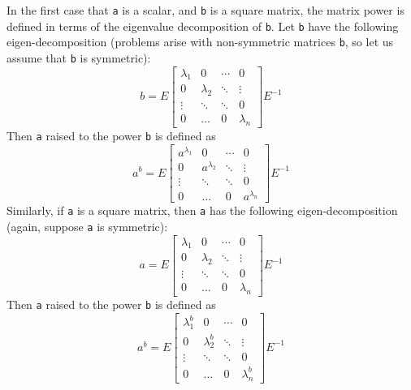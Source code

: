 In the first case that \verb|a| is a scalar, and \verb|b| is a square matrix, the matrix power is defined in terms of the eigenvalue decomposition of \verb|b|.  Let \verb|b| have the following eigen-decomposition (problems arise with non-symmetric matrices \verb|b|, so let us assume that \verb|b| is symmetric):
\[
  b = E \begin{bmatrix} \lambda_1 & 0          & \cdots  & 0 \\                            0   & \lambda_2  &  \ddots & \vdots \\                                         \vdots & \ddots & \ddots & 0 \\                                                 0   & \hdots & 0 & \lambda_n \end{bmatrix}
      E^{-1}
\]
Then \verb|a| raised to the power \verb|b| is defined as
\[
  a^{b} = E \begin{bmatrix} a^{\lambda_1} & 0          & \cdots  & 0 \\                                0   & a^{\lambda_2}  &  \ddots & \vdots \\                                    \vdots & \ddots & \ddots & 0 \\                                             0   & \hdots & 0 & a^{\lambda_n} \end{bmatrix}
      E^{-1}
\]
Similarly, if \verb|a| is a square matrix, then \verb|a| has the following eigen-decomposition (again, suppose \verb|a| is symmetric):
\[
  a = E \begin{bmatrix} \lambda_1 & 0          & \cdots  & 0 \\                                0   & \lambda_2  &  \ddots & \vdots \\                                         \vdots & \ddots & \ddots & 0 \\                                          0   & \hdots & 0 & \lambda_n \end{bmatrix}
      E^{-1}
\]
Then \verb|a| raised to the power \verb|b| is defined as
\[
  a^{b} = E \begin{bmatrix} \lambda_1^b & 0          & \cdots  & 0 \\                              0   & \lambda_2^b  &  \ddots & \vdots \\                              \vdots & \ddots & \ddots & 0 \\                              0   & \hdots & 0 & \lambda_n^b \end{bmatrix}
      E^{-1}
\]

